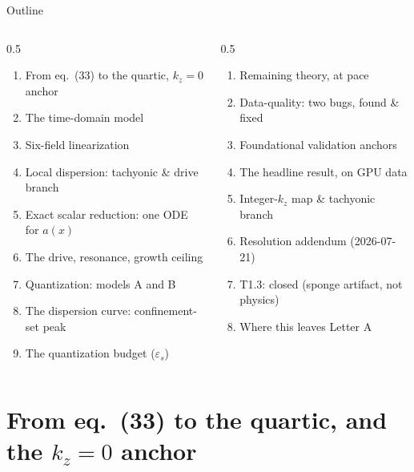 \documentclass[aspectratio=169,11pt]{beamer}
\newcommand{\eps}{\varepsilon_s}
\newcommand{\kz}{k_z}
\begin{document}
\begin{frame}{Outline}
\footnotesize
\begin{columns}[T]
\begin{column}{0.5\textwidth}
\begin{enumerate}
\footnotesize
\item From eq.~(33) to the quartic, $\kz{=}0$ anchor
\item The time-domain model
\item Six-field linearization
\item Local dispersion: tachyonic \& drive branch
\item Exact scalar reduction: one ODE for $a(x)$
\item The drive, resonance, growth ceiling
\item Quantization: models A and B
\item The dispersion curve: confinement-set peak
\item The quantization budget ($\eps$)
\end{enumerate}
\end{column}
\begin{column}{0.5\textwidth}
\begin{enumerate}
\footnotesize
\setcounter{enumi}{9}
\item Remaining theory, at pace
\item Data-quality: two bugs, found \& fixed
\item Foundational validation anchors
\item The headline result, on GPU data
\item Integer-$\kz$ map \& tachyonic branch
\item Resolution addendum (2026-07-21)
\item T1.3: closed (sponge artifact, not physics)
\item Where this leaves Letter A
\end{enumerate}
\end{column}
\end{columns}
\end{frame}

\section{From eq.~(33) to the quartic, and the $\kz=0$ anchor}
\end{document}
